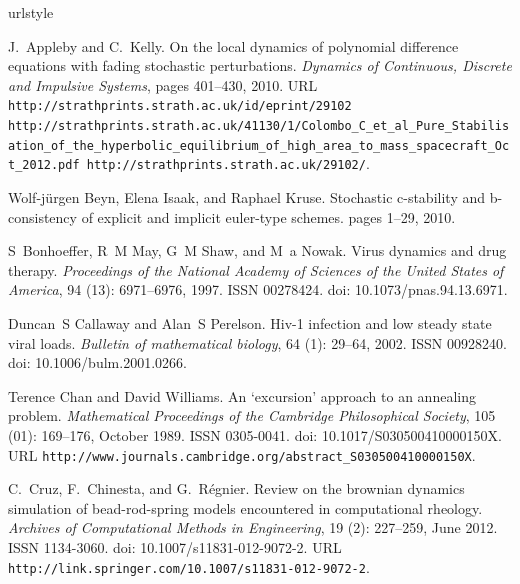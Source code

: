 \documentclass[sort&compress, preprint]{elsarticle}
\theoremstyle{definition}
\theoremstyle{plain}%
\theoremstyle{remark}
\begin{document}
\begin{thebibliography}{36}
\providecommand{\natexlab}[1]{#1}
\providecommand{\url}[1]{\texttt{#1}}
\expandafter\ifx\csname urlstyle\endcsname\relax
  \providecommand{\doi}[1]{doi: #1}\else
  \providecommand{\doi}{doi: \begingroup \urlstyle{rm}\Url}\fi

J.~Appleby and C.~Kelly.
\newblock On the local dynamics of polynomial difference equations with fading
  stochastic perturbations.
\newblock \emph{Dynamics of Continuous, Discrete and Impulsive Systems}, pages
  401--430, 2010.
\newblock URL \url{http://strathprints.strath.ac.uk/id/eprint/29102
  http://strathprints.strath.ac.uk/41130/1/Colombo\_C\_et\_al\_Pure\_Stabilisation\_of\_the\_hyperbolic\_equilibrium\_of\_high\_area\_to\_mass\_spacecraft\_Oct\_2012.pdf
  http://strathprints.strath.ac.uk/29102/}.

Wolf-j\"{u}rgen Beyn, Elena Isaak, and Raphael Kruse.
\newblock Stochastic c-stability and b-consistency of explicit and implicit
  euler-type schemes.
\newblock pages 1--29, 2010.

S~Bonhoeffer, R~M May, G~M Shaw, and M~a Nowak.
\newblock Virus dynamics and drug therapy.
\newblock \emph{Proceedings of the National Academy of Sciences of the United
  States of America}, 94 (13): 6971--6976, 1997.
\newblock ISSN 00278424.
\newblock \doi{10.1073/pnas.94.13.6971}.

Duncan~S Callaway and Alan~S Perelson.
\newblock Hiv-1 infection and low steady state viral loads.
\newblock \emph{Bulletin of mathematical biology}, 64 (1):
  29--64, 2002.
\newblock ISSN 00928240.
\newblock \doi{10.1006/bulm.2001.0266}.

Terence Chan and David Williams.
\newblock An `excursion' approach to an annealing problem.
\newblock \emph{Mathematical Proceedings of the Cambridge Philosophical
  Society}, 105 (01): 169--176, October 1989.
\newblock ISSN 0305-0041.
\newblock \doi{10.1017/S030500410000150X}.
\newblock URL
  \url{http://www.journals.cambridge.org/abstract\_S030500410000150X}.

C.~Cruz, F.~Chinesta, and G.~R\'{e}gnier.
\newblock Review on the brownian dynamics simulation of bead-rod-spring models
  encountered in computational rheology.
\newblock \emph{Archives of Computational Methods in Engineering}, 19
  (2): 227--259, June 2012.
\newblock ISSN 1134-3060.
\newblock \doi{10.1007/s11831-012-9072-2}.
\newblock URL \url{http://link.springer.com/10.1007/s11831-012-9072-2}.


\end{thebibliography}
\end{document}
